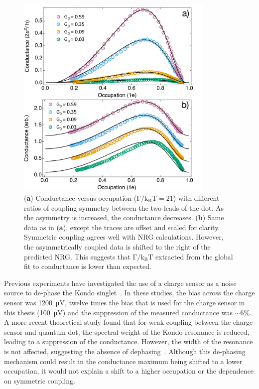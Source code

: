\begin{figure}[!bht]
 \begin{center}
 \includegraphics[width=0.85\textwidth]{figures/ch3/figure19.pdf}
 \caption[Conductance versus Occupation : Varying Coupling Symmetry]{\label{fig:ch3/cond_occ_assymetry} 
 (\textbf{a}) Conductance versus occupation ($\mathrm{\Gamma/k_BT=21}$) with different ratios of coupling symmetry between the two leads of the dot. As the asymmetry is increased, the conductance decreases.
 (\textbf{b}) Same data as in (\textbf{a}), except the traces are offset and scaled for clarity. Symmetric coupling agrees well with NRG calculations. However, the asymmetrically coupled data is shifted to the right of the predicted NRG. This suggests that $\mathrm{\Gamma/k_BT}$ extracted from the global fit to conductance is lower than expected.}
 \end{center}
\end{figure}


Previous experiments have investigated the use of a charge sensor as a noise source to de-phase the Kondo singlet~\cite{kondo_controlled_dephasing}. In these studies, the bias across the charge sensor was \qty{1200}{\micro V}, twelve times the bias that is used for the charge sensor in this thesis (\qty{100}{\micro V}) and the suppression of the measured conductance was $\sim6\%$. 
A more recent theoretical study found that for weak coupling between the charge sensor and quantum dot, the spectral weight of the Kondo resonance is reduced, leading to a suppression of the conductance. However, the width of the resonance is not affected, suggesting the absence of dephasing~\cite{peculiar_dephasing_of_kondo}. Although this de-phasing mechanism could result in the conductance maximum being shifted to a lower occupation, it would not explain a shift to a higher occupation or the dependence on symmetric coupling.


